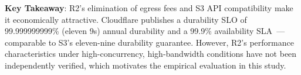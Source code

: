 \textbf{Key Takeaway}: R2's elimination of egress fees and S3 API compatibility make it economically attractive. Cloudflare publishes a durability SLO of 99.999999999\% (eleven 9s) annual durability and a 99.9\% availability SLA~\cite{cloudflare-r2-durability}---comparable to S3's eleven-nine durability guarantee. However, R2's performance characteristics under high-concurrency, high-bandwidth conditions have not been independently verified, which motivates the empirical evaluation in this study.

